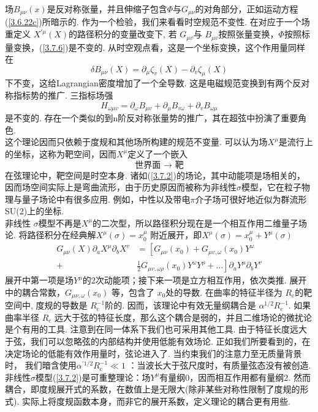 场$B_{\mu\nu}(x)$是反对称张量，并且伸缩子包含$\Phi$与$G_{\mu\nu}$的对角部分，正如运动方程(\ref{3.6.22c})所暗示的. 作为一个检验，我们来看看时空规范不变性. 在对应于一个场重定义 $X^{\prime \mu}(X)$的路径积分的变量改变下, 若 $G_{\mu v}$与 $B_{\mu v}$按照张量变换，$\Phi$按照标量变换，(\ref{3.7.6})是不变的. 从时空观点看，这是一个坐标变换，这个作用量同样在
\begin{equation}
\delta B_{\mu \nu}(X)=\partial_{\mu} \zeta_{v}(X)-\partial_{v} \zeta_{\mu}(X)
\end{equation}
下不变，这给Lagrangian密度增加了一个全导数. 这是电磁规范变换到有两个反对称指标势的推广. 三指标场强
\begin{equation}
H_{\omega \mu v}=\partial_{\omega} B_{\mu v}+\partial_{\mu} B_{v \omega}+\partial_{v} B_{\omega \mu}
\end{equation}
是不变的. 存在一个类似的到n阶反对称张量势的推广，其在超弦中扮演了重要角色.\\
这个理论因而只依赖于度规和其他场所构建的规范不变量. 可以认为场$X^\mu$是流行上的坐标，这称为靶空间，因而$X^\mu$定义了一个嵌入
\begin{equation}
\text { 世界面 } \rightarrow \text { 靶 }
\end{equation}
在弦理论中，靶空间是时空本身. 诸如(\ref{3.7.2})的场论，其中动能项是场相关的，因而场空间实际上是弯曲流形，由于历史原因而被称为非线性$\sigma$模型，它在粒子物理与量子场论中有很多应用. 例如，中性以及带电$\pi$介子场可很好地近似为群流形SU(2)上的坐标. \\
非线性 $\sigma$模型不再是$X^\mu$的二次型，所以路径积分现在是一个相互作用二维量子场论. 将路径积分在经典解$X^{\mu}(\sigma)=x_{0}^{\mu}$ 附近展开，即$X^{\mu}(\sigma)=x_{0}^{\mu}+Y^{\mu}(\sigma)$
\begin{equation}
\begin{aligned}
G_{\mu \nu}(X) \partial_{a} X^{\mu} \partial_{b} X^{v} &=\left[G_{\mu \nu}\left(x_{0}\right)+G_{\mu v, \omega}\left(x_{0}\right) Y^{\omega}\right.\\
+&\left.\frac{1}{2} G_{\mu v, \omega \rho}\left(x_{0}\right) Y^{\omega} Y^{\rho}+\ldots\right] \partial_{a} Y^{\mu} \partial_{b} Y^{v}
\end{aligned}
\end{equation}
展开中第一项是场$Y^\mu$的2次动能项；接下来一项是立方相互作用，依次类推. 展开中的耦合常数，$G_{\mu \nu, \omega}\left(x_{0}\right)$
等，包含了 $x_{0}$处的导数. 在曲率的特征半径为 $R_{\mathrm{c}}$的靶空间中, 度规的导数是 $R_{\mathrm{c}}^{-1}$阶的. 因而，该理论中有效无量纲耦合是 $\alpha^{1 / 2} R_{\mathrm{c}}^{-1}$. 如果曲率半径 $R_{\mathrm{c}}$ 远大于弦的特征长度，那么这个耦合是弱的，并且二维场论的微扰论是个有用的工具. 注意到在同一体系下我们也可采用其他工具. 由于特征长度远大于弦，我们可以忽略弦的内部结构并使用低能有效场论. 正如我们所要看到的，在决定场论的低能有效作用量时，弦论进入了. 当约束我们的注意力至无质量背景时， 我们暗含使用$\alpha^{\prime 1 / 2} R_{\mathrm{c}}^{-1} \ll 1$ ：当波长大于弦尺度时，有质量弦态没有被创造.\\
非线性$\sigma$模型(\ref{3.7.2})是可重整理论：场$Y^\mu$有量纲0，因而相互作用都有量纲2. 然而耦合，即度规展开式的系数，在数值上是无限大(除非某些对称性限制了度规的形式). 实际上将度规函数本身，而非它的展开系数，定义理论的耦合更有用些.\\

